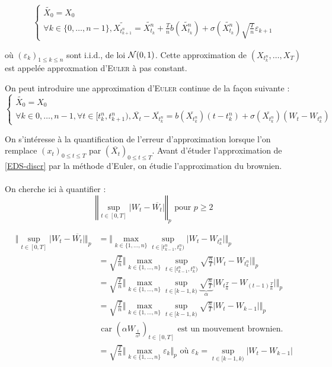   \[
    \begin{cases}
      \widetilde{X_0} = X_0 \\
      \forall k \in \{0, \ldots, n-1\}, \widetilde{X_{t_{k+1}^n}} = \widetilde{X_{t_k}^n} + \frac{T}{n} b(\widetilde{X_{t_k}^n}) + \sigma(\widetilde{X_{t_k}^n})\sqrt{ \frac{T}{n}} \varepsilon_{k+1}
    \end{cases}
  \]

  où $\left(\varepsilon_k\right)_{1 \leq k \leq n}$ sont i.i.d., de loi $\mathcal{N}(0,1)$.
  Cette approximation de $(X_{t_k^n},\ldots,X_T)$ est appelée approxmation d'\textsc{Euler} à pas constant.

  On peut introduire une approximation d'\textsc{Euler} continue de la façon suivante :
  \[
    \begin{cases}
      \widetilde{X_0} = X_0 \\
      \forall k \in {0, \ldots, n-1}, \forall t \in [t_k^n, t_{k+1}^n), \overline{X_t} - \overline{X_{t_k^n}} = b(\overline{X_{t_k^n}}) (t-t_k^n) + \sigma(\overline{X_{t_k^n}})(W_t - W_{t_k^n})
    \end{cases}
  \]

  On s'intéresse à la quantification de l'erreur d'approximation lorsque l'on remplace $(x_t)_{0 \leq t \leq T}$ par $(\overline{X_t})_{0 \leq t \leq T}$. Avant d'étuder l'approximation de \eqref{EDS-discr} par la méthode d'Euler, on étudie l'approximation du brownien. \\

 \\
On cherche ici à quantifier :
\[ \left\Vert \sup_{t \in [0,T]} \vert W_t - \overline{W_t} \vert \right\Vert_p \text{ pour } p \geq 2 \]

\newcommand{\maxn}{\max_{k\in\{1,\ldots,n\} } }
\newcommand{\supt}{\sup_{t \in [t_{k-1}^n, t_k^n)} }
\renewcommand{\wtk}{W_{t_k^n}}
\begin{equation*}
\begin{split}
  \Vert \sup_{t \in [0,T]} \vert W_t - \overline{W_t} \vert \Vert_p &= \Vert \maxn \supt \vert W_t - \wtk \vert \Vert_p  \\
  &= \sqrt{\frac{T}{n}} \Vert \maxn \supt \sqrt{\frac{n}{T}} \vert W_t - \wtk \vert \Vert_p  \\
  &= \sqrt{\frac{T}{n}} \Vert \maxn \sup_{t \in [k-1, k)} \underbrace{\sqrt{\frac{n}{T}}}_\alpha \vert W_{t {\frac{T}{n}}} - W_{(t-1) \frac{T}{n}} \vert \Vert_p \\
  &= \sqrt{\frac{T}{n}} \Vert \maxn \sup_{t \in [k-1, k)} \sqrt{\frac{n}{T}} \vert W_t - W_{k-1} \vert \Vert_p \\
  &\text{ car $(\alpha W_{ \frac{t}{\alpha^2}})_{t \in [0,T]}$ est un mouvement brownien. } \\
  &= \sqrt{ \frac{T}{n} } \Vert \max_{k \in \{ 1, \ldots, n \}} \varepsilon_k \Vert_p \text{ où } \varepsilon_k = \sup_{t \in [k-1, k)} \vert W_t - W_{k-1} \vert
\end{split}
\end{equation*}

